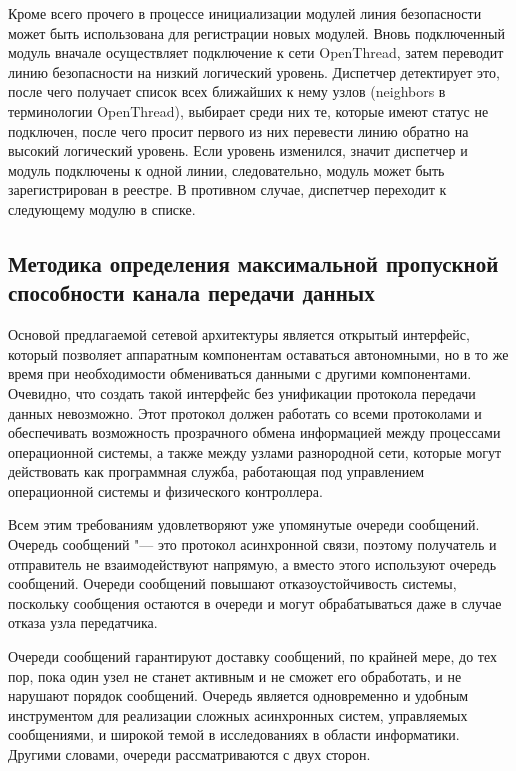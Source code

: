 Кроме всего прочего в процессе инициализации модулей линия безопасности может быть использована для регистрации новых модулей. Вновь подключенный модуль вначале осуществляет подключение к сети OpenThread, затем переводит линию безопасности на низкий логический уровень. Диспетчер детектирует это, после чего получает список всех ближайших к нему узлов (neighbors в терминологии OpenThread), выбирает среди них те, которые имеют статус не подключен, после чего просит первого из них перевести линию обратно на высокий логический уровень. Если уровень изменился, значит диспетчер и модуль подключены к одной линии, следовательно, модуль может быть зарегистрирован в реестре. В противном случае, диспетчер переходит к следующему модулю в списке.

\subsection{Методика определения максимальной пропускной способности канала передачи данных}

Основой предлагаемой сетевой архитектуры является открытый интерфейс, который позволяет аппаратным компонентам оставаться автономными, но в то же время при необходимости обмениваться данными с другими компонентами. Очевидно, что создать такой интерфейс без унификации протокола передачи данных невозможно. Этот протокол должен работать со всеми протоколами и обеспечивать возможность прозрачного обмена информацией между процессами операционной системы, а также между узлами разнородной сети, которые могут действовать как программная служба, работающая под управлением операционной системы и физического контроллера.

Всем этим требованиям удовлетворяют уже упомянутые очереди сообщений. Очередь сообщений "--- это протокол асинхронной связи, поэтому получатель и отправитель не взаимодействуют напрямую, а вместо этого используют очередь сообщений. Очереди сообщений повышают отказоустойчивость системы, поскольку сообщения остаются в очереди и могут обрабатываться даже в случае отказа узла передатчика.

Очереди сообщений гарантируют доставку сообщений, по крайней мере, до тех пор, пока один узел не станет активным и не сможет его обработать, и не нарушают порядок сообщений. Очередь является одновременно и удобным инструментом для реализации сложных асинхронных систем, управляемых сообщениями, и широкой темой в исследованиях в области информатики. Другими словами, очереди рассматриваются с двух сторон.

